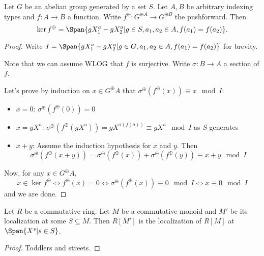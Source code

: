 \begin{proposition}
  \label{0-ker-mon-alg}
  \uses{}

  Let $G$ be an abelian group generated by a set $S$.
  Let $A, B$ be arbitrary indexing types and $f : A \to B$ a function.
  Write $f^\oplus : G^{\oplus A} \to G^{\oplus B}$ the pushforward.
  Then
  \[
    \ker f^\oplus = \Span\{gX^a_1 - gX^a_2 | g \in S, a_1, a_2 \in A, f(a_1) = f(a_2)\}.
  \]
\end{proposition}
\begin{proof}
  \uses{}

  Write $I = \Span\{gX^a_1 - gX^a_2 | g \in G, a_1, a_2 \in A, f(a_1) = f(a_2)\}$ for brevity.

  Note that we can assume WLOG that $f$ is surjective.
  Write $\sigma : B \to A$ a section of $f$.

  Let's prove by induction on $x \in G^\oplus A$ that $\sigma^\oplus(f^\oplus(x)) \equiv x \mod I$:
  \begin{itemize}
    \item $x = 0$: $\sigma^\oplus(f^\oplus(0)) = 0$
    \item $x = gX^a$:
      $\sigma^\oplus(f^\oplus(gX^a)) = gX^{\sigma(f(a))} \equiv gX^a \mod I$ as $S$ generates
    \item $x + y$: Assume the induction hypothesis for $x$ and $y$. Then
      \[
        \sigma^\oplus(f^\oplus(x + y)) = \sigma^\oplus(f^\oplus(x)) + \sigma^\oplus(f^\oplus(y))
          \equiv x + y \mod I
      \]
  \end{itemize}

  Now, for any $x \in G^\oplus A$,
  \[
    x \in \ker f^\oplus \iff f^\oplus(x) = 0 \iff
      \sigma^\oplus(f^\oplus(x)) \equiv 0 \mod I \iff x \equiv 0 \mod I
  \]
  and we are done.
\end{proof}


\begin{proposition}
  \label{0-loc-mon-alg}
  \uses{}

  Let $R$ be a commutative ring.
  Let $M$ be a commutative monoid and $M'$ be its localization at some $S \subseteq M$.
  Then $R[M']$ is the localization of $R[M]$ at $\Span \{X^s | s \in S\}$.
\end{proposition}
\begin{proof}
  \uses{}

  Toddlers and streets.
\end{proof}


